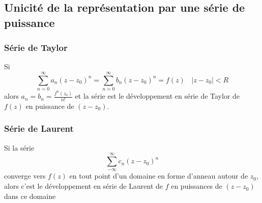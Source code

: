 	\subsection{Unicité de la représentation par une série de puissance}
		\subsubsection{Série de Taylor}
		Si 
		\begin{equation}
		\sum_{n=0}^\infty a_n(z-z_0)^n = \sum_{n=0}^\infty b_n(z-z_0)^n = f(z)\ \ \ \ |z-z_0| < R
		\end{equation}
		alors $a_n = b_n = \frac{f^n(z_0)}{n!}$ et la série est le développement en série de 
		Taylor de $f(z)$ en puissance de $(z-z_0)$.
		
		\subsubsection{Série de Laurent}
		Si la série 
		\begin{equation}
		\sum_{-\infty}^\infty c_n(z-z_0)^n
		\end{equation}
		converge vers $f(z)$ en tout point d'un domaine en forme d'anneau autour de $z_0$, 
		alors c'est le développement en série de Laurent de $f$ en puissances de $(z-z_0)$ 
		dans ce domaine
		
		
